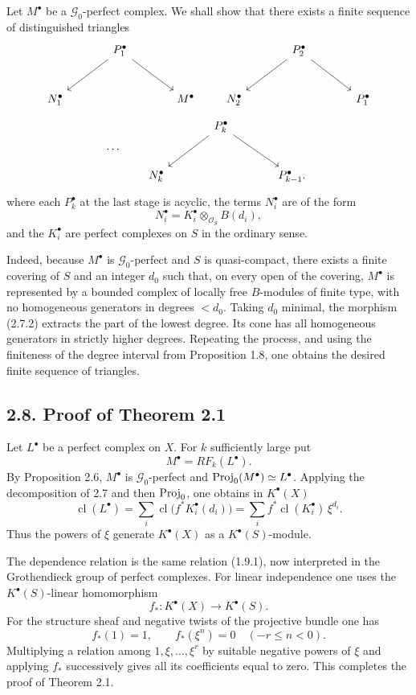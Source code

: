 \documentclass[11pt]{article}
\newcommand{\cl}{\operatorname{cl}}
\begin{document}
Let \(M^\bullet\) be a \(\mathcal G_0\)-perfect complex. We shall show that there exists a finite sequence of distinguished triangles
\[
\begin{tikzcd}[column sep=large,row sep=large]
& P_1^\bullet \arrow[dl] \arrow[dr] &\\
N_1^\bullet && M^\bullet
\end{tikzcd}
\qquad
\begin{tikzcd}[column sep=large,row sep=large]
& P_2^\bullet \arrow[dl] \arrow[dr] &\\
N_2^\bullet && P_1^\bullet
\end{tikzcd}
\]
\[
\cdots\qquad
\begin{tikzcd}[column sep=large,row sep=large]
& P_k^\bullet \arrow[dl] \arrow[dr] &\\
N_k^\bullet && P_{k-1}^\bullet .
\end{tikzcd}
\]
where each \(P_k^\bullet\) at the last stage is acyclic, the terms \(N_i^\bullet\) are of the form
\[
  N_i^\bullet=K_i^\bullet\otimes_{\mathcal O_S}B(d_i),
\]
and the \(K_i^\bullet\) are perfect complexes on \(S\) in the ordinary sense.

Indeed, because \(M^\bullet\) is \(\mathcal G_0\)-perfect and \(S\) is quasi-compact, there exists a finite covering of \(S\) and an integer \(d_0\) such that, on every open of the covering, \(M^\bullet\) is represented by a bounded complex of locally free \(B\)-modules of finite type, with no homogeneous generators in degrees \(<d_0\). Taking \(d_0\) minimal, the morphism (2.7.2) extracts the part of the lowest degree. Its cone has all homogeneous generators in strictly higher degrees. Repeating the process, and using the finiteness of the degree interval from Proposition 1.8, one obtains the desired finite sequence of triangles.

\subsection*{2.8. Proof of Theorem 2.1}
Let \(L^\bullet\) be a perfect complex on \(X\). For \(k\) sufficiently large put
\[
  M^\bullet=RF_k(L^\bullet).
\]
By Proposition 2.6, \(M^\bullet\) is \(\mathcal G_0\)-perfect and \(\operatorname{Proj}_0(M^\bullet)\simeq L^\bullet\). Applying the decomposition of 2.7 and then \(\operatorname{Proj}_0\), one obtains in \(K^\bullet(X)\)
\[
  \cl(L^\bullet)
  =
  \sum_i \cl\bigl(f^*K_i^\bullet(d_i)\bigr)
  =
  \sum_i f^*\cl(K_i^\bullet)\,\xi^{d_i}.
\]
Thus the powers of \(\xi\) generate \(K^\bullet(X)\) as a \(K^\bullet(S)\)-module.

The dependence relation is the same relation (1.9.1), now interpreted in the Grothendieck group of perfect complexes. For linear independence one uses the \(K^\bullet(S)\)-linear homomorphism
\[
  f_*:K^\bullet(X)\longrightarrow K^\bullet(S).
\]
For the structure sheaf and negative twists of the projective bundle one has
\[
  f_*(1)=1,\qquad f_*(\xi^n)=0\quad(-r\leq n<0).
\]
Multiplying a relation among \(1,\xi,\ldots,\xi^r\) by suitable negative powers of \(\xi\) and applying \(f_*\) successively gives all its coefficients equal to zero. This completes the proof of Theorem 2.1.
\end{document}
